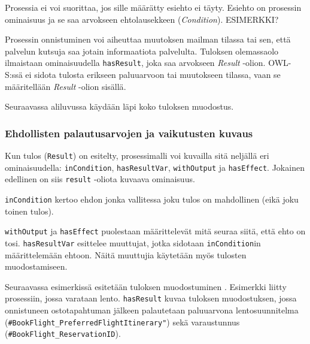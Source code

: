 \documentclass[finnish]{tktltiki2}
\theoremstyle{definition}
\theoremstyle{remark}
\begin{document}
Prosessia ei voi suorittaa, jos sille määrätty esiehto ei täyty\cite{OWLS}. Esiehto on prosessin ominaisuus ja se saa arvokseen ehtolausekkeen (\textit{Condition}). ESIMERKKI?

Prosessin onnistuminen voi aiheuttaa muutoksen mailman tilassa tai sen, että palvelun kutsuja saa jotain informaatiota palvelulta. Tuloksen olemassaolo ilmaistaan ominaisuudella \texttt{hasResult}, joka saa arvokseen \textit{Result} -olion.  OWL-S:ssä ei sidota tulosta erikseen paluuarvoon tai muutokseen tilassa, vaan se määritellään \textit{Result} -olion sisällä\cite{OWLS}. 

Seuraavassa aliluvussa käydään läpi koko tuloksen muodostus.

\subsubsection{Ehdollisten palautusarvojen ja vaikutusten kuvaus}

Kun tulos (\texttt{Result}) on esitelty, prosessimalli voi kuvailla sitä neljällä eri ominaisuudella\cite{OWLS}: \texttt{inCondition}, \texttt{hasResultVar}, \texttt{withOutput} ja \texttt{hasEffect}\cite{OWLS}.  Jokainen edellinen on siis \texttt{result} -oliota kuvaava ominaisuus.  

\texttt{inCondition} kertoo ehdon jonka vallitessa joku tulos on mahdollinen (eikä joku toinen tulos). 

\texttt{withOutput} ja \texttt{hasEffect} puolestaan määrittelevät mitä seuraa siitä, että ehto on tosi. \texttt{hasResultVar} esittelee muuttujat, jotka sidotaan \texttt{inCondition}in määrittelemään ehtoon.  Näitä muuttujia käytetään myös tulosten muodostamiseen\cite{OWLS}. 

Seuraavassa esimerkissä esitetään tuloksen muodostuminen \cite{daml}. Esimerkki liitty prosessiin, jossa varataan lento. \texttt{hasResult} kuvaa tuloksen muodostuksen, jossa onnistuneen ostotapahtuman jälkeen palautetaan paluuarvona lentosuunnitelma (\texttt{\#BookFlight\_PreferredFlightItinerary"}) sekä varaustunnus (\texttt{\#BookFlight\_ReservationID}). 
\end{document}
